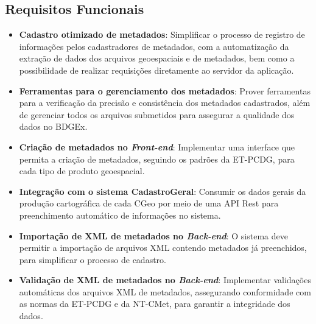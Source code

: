 \subsection{Requisitos Funcionais}
\begin{itemize}
    \item \textbf{Cadastro otimizado de metadados}: Simplificar o processo de registro de informações pelos cadastradores de metadados, com a automatização da extração de dados dos arquivos geoespaciais e de metadados, bem como a possibilidade de realizar requisições diretamente ao servidor da aplicação.
    
    \item \textbf{Ferramentas para o gerenciamento dos metadados}: Prover ferramentas para a verificação da precisão e consistência dos metadados cadastrados, além de gerenciar todos os arquivos submetidos para assegurar a qualidade dos dados no BDGEx.
    
    \item \textbf{Criação de metadados no \textit{Front-end}}: Implementar uma interface que permita a criação de metadados, seguindo os padrões da ET-PCDG, para cada tipo de produto geoespacial.
    
    \item \textbf{Integração com o sistema CadastroGeral}: Consumir os dados gerais da produção cartográfica de cada CGeo por meio de uma API Rest para preenchimento automático de informações no sistema.
    
    \item \textbf{Importação de XML de metadados no \textit{Back-end}}: O sistema deve permitir a importação de arquivos XML contendo metadados já preenchidos, para simplificar o processo de cadastro.
    
    \item \textbf{Validação de XML de metadados no \textit{Back-end}}: Implementar validações automáticas dos arquivos XML de metadados, assegurando conformidade com as normas da ET-PCDG e da NT-CMet, para garantir a integridade dos dados.
\end{itemize}

